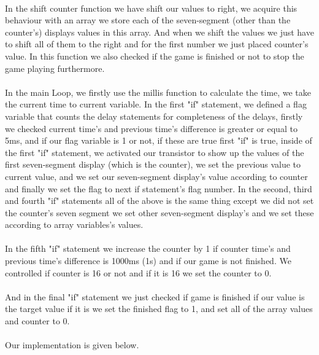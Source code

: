 \documentclass[pdftex,12pt,a4paper]{article}
\begin{document}
\begin{flushleft}
\paragraph{}
In the shift counter function we have shift our values to right, we acquire this behaviour with an array we store each of the seven-segment (other than the counter's) displays values in this array. And when we shift the values we just have to shift all of them to the right and for the first number we just placed counter's value. In this function we also checked if the game is finished or not to stop the game playing furthermore.
\paragraph{}
In the main Loop, we firstly use the millis function to calculate the time, we take the current time to current variable. In the first "if" statement, we defined a flag variable that counts the delay statements for completeness of the delays, firstly we checked current time's and previous time's difference is greater or equal to 5ms, and if our flag variable is 1 or not, if these are true first "if" is true, inside of the first "if" statement, we activated our transistor to show up the values of the first seven-segment display (which is the counter), we set the previous value to current value, and we set our seven-segment display's value according to counter and finally we set the flag to next if statement's flag number. In the second, third and fourth "if" statements all of the above is the same thing except we did not set the counter's seven segment we set other seven-segment display's and we set these according to array variables's values.
\paragraph{}
In the fifth "if" statement we increase the counter by 1 if counter time's and previous time's difference is 1000ms (1s) and if our game is not finished. We controlled if counter is 16 or not and if it is 16 we set the counter to 0.
\paragraph{}
And in the final "if" statement we just checked if game is finished if our value is the target value if it is we set the finished flag to 1, and set all of the array values and counter to 0.

\newpage{}
\paragraph{}
Our implementation is given below.


\end{flushleft}
\end{document}
